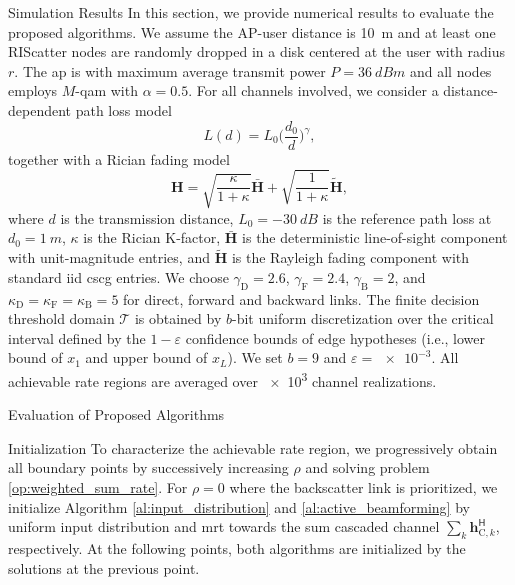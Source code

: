 \begin{section}{Simulation Results}
	\label{sc:simulation_results}
	In this section, we provide numerical results to evaluate the proposed algorithms.
	We assume the AP-user distance is \qty{10}{m} and at least one RIScatter nodes are randomly dropped in a disk centered at the user with radius $r$.
	The \gls{ap} is with maximum average transmit power $P=\qty{36}{dBm}$ and all nodes employs $M$-\gls{qam} with $\alpha=0.5$.
	For all channels involved, we consider a distance-dependent path loss model
	\begin{equation}
		L(d) = L_0 \biggl(\frac{d_0}{d}\biggr)^\gamma,
	\end{equation}
	together with a Rician fading model
	\begin{equation}
		\mathbf{H} = \sqrt{\frac{\kappa}{1+\kappa}} \bar{\mathbf{H}} + \sqrt{\frac{1}{1+\kappa}} \tilde{\mathbf{H}},
	\end{equation}
	where $d$ is the transmission distance, $L_0=-\qty{30}{dB}$ is the reference path loss at $d_0=\qty{1}{m}$, $\kappa$ is the Rician K-factor, $\bar{\mathbf{H}}$ is the deterministic line-of-sight component with unit-magnitude entries, and $\tilde{\mathbf{H}}$ is the Rayleigh fading component with standard \gls{iid} \gls{cscg} entries.
	We choose $\gamma_{\text{D}}=2.6$, $\gamma_{\text{F}}=2.4$, $\gamma_{\text{B}}=2$, and $\kappa_{\text{D}}=\kappa_{\text{F}}=\kappa_{\text{B}}=5$ for direct, forward and backward links.
	The finite decision threshold domain $\mathcal{T}$ is obtained by $b$-bit uniform discretization over the critical interval defined by the $1-\varepsilon$ confidence bounds of edge hypotheses (i.e., lower bound of $x_1$ and upper bound of $x_L$).
	We set $b=9$ and $\varepsilon=\num{e-3}$.
	All achievable rate regions are averaged over \num{e3} channel realizations.

	\begin{subsection}{Evaluation of Proposed Algorithms}
		\begin{subsubsection}{Initialization}
			To characterize the achievable rate region, we progressively obtain all boundary points by successively increasing $\rho$ and solving problem \eqref{op:weighted_sum_rate}.
			For $\rho=0$ where the backscatter link is prioritized, we initialize Algorithm \ref{al:input_distribution} and \ref{al:active_beamforming} by uniform input distribution and \gls{mrt} towards the sum cascaded channel $\sum_{k} \mathbf{h}_{\text{C},k}^\mathsf{H}$, respectively.
			At the following points, both algorithms are initialized by the solutions at the previous point.
		\end{subsubsection}


\end{subsection}
\end{section}
